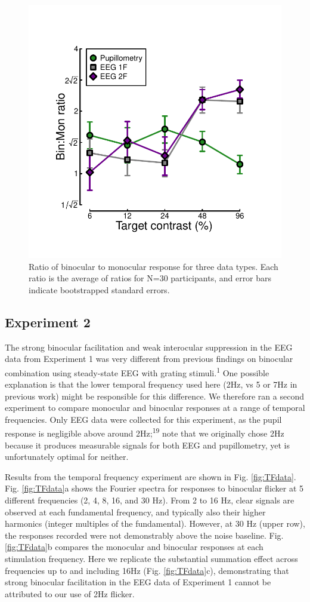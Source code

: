 \documentclass[
]{article}
\begin{document}
\begin{figure}

{\centering \includegraphics[width=0.5\linewidth]{Figures/BSratios} 

}

\caption{Ratio of binocular to monocular response for three data types. Each ratio is the average of ratios for N=30 participants, and error bars indicate bootstrapped standard errors.}\label{fig:BSratios}
\end{figure}

\hypertarget{experiment-2}{%
\subsection{Experiment 2}\label{experiment-2}}

The strong binocular facilitation and weak interocular suppression in the EEG data from Experiment 1 was very different from previous findings on binocular combination using steady-state EEG with grating stimuli.\textsuperscript{1} One possible explanation is that the lower temporal frequency used here (2Hz, vs 5 or 7Hz in previous work) might be responsible for this difference. We therefore ran a second experiment to compare monocular and binocular responses at a range of temporal frequencies. Only EEG data were collected for this experiment, as the pupil response is negligible above around 2Hz;\textsuperscript{19} note that we originally chose 2Hz because it produces measurable signals for both EEG and pupillometry, yet is unfortunately optimal for neither.

Results from the temporal frequency experiment are shown in Fig. \ref{fig:TFdata}. Fig. \ref{fig:TFdata}a shows the Fourier spectra for responses to binocular flicker at 5 different frequencies (2, 4, 8, 16, and 30 Hz). From 2 to 16 Hz, clear signals are observed at each fundamental frequency, and typically also their higher harmonics (integer multiples of the fundamental). However, at 30 Hz (upper row), the responses recorded were not demonstrably above the noise baseline. Fig. \ref{fig:TFdata}b compares the monocular and binocular responses at each stimulation frequency. Here we replicate the substantial summation effect across frequencies up to and including 16Hz (Fig. \ref{fig:TFdata}c), demonstrating that strong binocular facilitation in the EEG data of Experiment 1 cannot be attributed to our use of 2Hz flicker.
\end{document}
